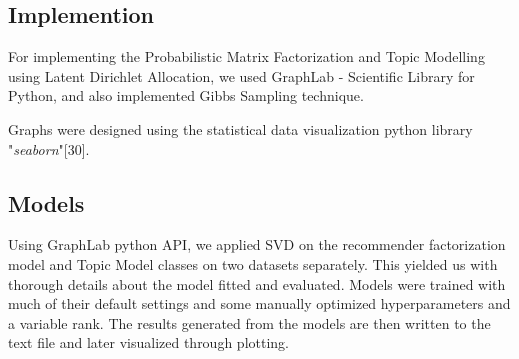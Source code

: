 \begin{figure}
  {\par}
\end{figure}


\subsection{Implemention}
For implementing the Probabilistic Matrix Factorization and Topic Modelling using Latent Dirichlet Allocation, we used GraphLab - Scientific Library for Python, and also implemented Gibbs Sampling technique.

Graphs were designed using the statistical data visualization python library "\textit{seaborn}"[30].

\subsection{Models}
Using GraphLab python API, we applied SVD on the recommender factorization model and Topic Model classes on two datasets separately. This yielded us with thorough details about the model fitted and evaluated. Models were trained with much of their default settings and some manually optimized hyperparameters and a variable rank. The results generated from the models are then written to the text file and later visualized through plotting.

